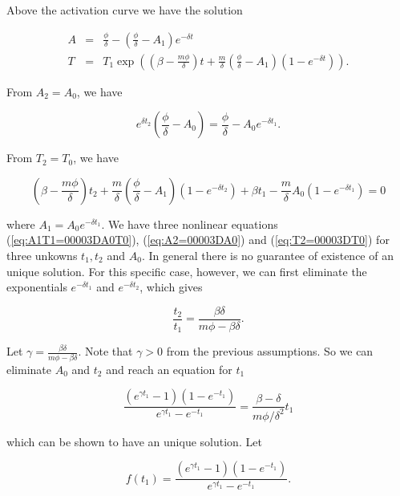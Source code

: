 \documentclass[review,authoryear]{elsarticle}
\begin{document}
Above the activation curve we have the solution 
\begin{linenomath*}
\begin{eqnarray*}
A & = & \frac{\phi}{\delta}-(\frac{\phi}{\delta}-A_{1})e^{-\delta t}\\
T & = & T_{1}\exp((\beta-\frac{m\phi}{\delta})t+\frac{m}{\delta}(\frac{\phi}{\delta}-A_{1})(1-e^{-\delta t})).
\end{eqnarray*}
\end{linenomath*}
From $A_{2}=A_{0}$, we have 
\begin{linenomath*}
\begin{equation}
e^{\delta t_{2}}(\frac{\phi}{\delta}-A_{0})=\frac{\phi}{\delta}-A_{0}e^{-\delta t_{1}}.\label{eq:A2=00003DA0}
\end{equation}
\end{linenomath*}
From $T_{2}=T_{0}$, we have
\begin{linenomath*} 
\begin{equation}
(\beta-\frac{m\phi}{\delta})t_{2}+\frac{m}{\delta}(\frac{\phi}{\delta}-A_{1})(1-e^{-\delta t_{2}})+\beta t_{1}-\frac{m}{\delta}A_{0}(1-e^{-\delta t_{1}})=0\label{eq:T2=00003DT0}
\end{equation}
\end{linenomath*}
where $A_{1}=A_{0}e^{-\delta t_{1}}$. We have three nonlinear equations (\ref{eq:A1T1=00003DA0T0}),
(\ref{eq:A2=00003DA0}) and (\ref{eq:T2=00003DT0}) for three unkowns
$t_{1},t_{2}$ and $A_{0}$. In general there is no guarantee of existence
of an unique solution. For this specific case, however, we can first
eliminate the exponentials $e^{-\delta t_{1}}$ and $e^{-\delta t_{2}}$,
which gives 
\begin{linenomath*}
\[
\frac{t_{2}}{t_{1}}=\frac{\beta\delta}{m\phi-\beta\delta}.
\]
\end{linenomath*}
Let $\gamma=\frac{\beta\delta}{m\phi-\beta\delta}$. Note that $\gamma>0$
from the previous assumptions. So we can eliminate $A_{0}$ and $t_{2}$
and reach an equation for $t_{1}$
\begin{linenomath*}
\begin{equation}
\frac{(e^{\gamma t_{1}}-1)(1-e^{-t_{1}})}{e^{\gamma t_{1}}-e^{-t_{1}}}=\frac{\beta-\delta}{m\phi/\delta^{2}}t_{1}\label{eq:t1-period}
\end{equation}
\end{linenomath*}
which can be shown to have an unique solution. Let 
\begin{linenomath*}
\begin{equation}
f(t_{1})=\frac{(e^{\gamma t_{1}}-1)(1-e^{-t_{1}})}{e^{\gamma t_{1}}-e^{-t_{1}}}.\label{eq:f(t1)}
\end{equation}
\end{linenomath*}
\end{document}

